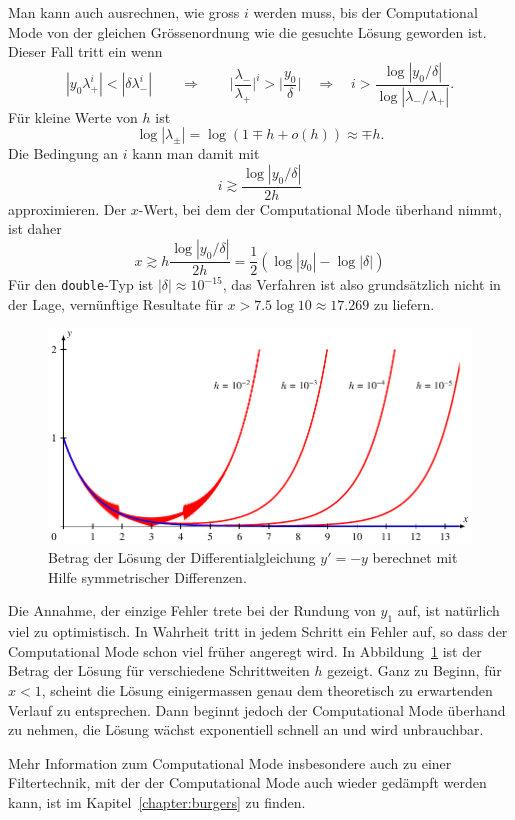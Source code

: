 Man kann auch ausrechnen, wie gross $i$ werden muss, bis der
Computational Mode von der gleichen Grössenordnung wie die
gesuchte Lösung geworden ist.
Dieser Fall tritt ein wenn
\[
|y_0\lambda_+^i| < |\delta\lambda_-^i|
\qquad\Rightarrow\qquad
\biggl|
\frac{\lambda_-}{\lambda_+}
\biggr|^i
> \biggl|\frac{y_0}{\delta}\biggr|
\quad\Rightarrow\quad
i
>
\frac{\log |y_0/\delta|}{\log|\lambda_-/\lambda_+|}.
\]
Für kleine Werte von $h$ ist
\[
\log |\lambda_\pm|
=
\log(1\mp h+o(h)) 
\approx
\mp h.
\]
Die Bedingung an $i$ kann man damit mit
\[
i \gtrsim \frac{\log |y_0/\delta|}{2h}
\]
approximieren.
Der $x$-Wert, bei dem der Computational Mode überhand nimmt, ist daher
\[
x \gtrsim h \frac{\log|y_0/\delta|}{2h} = \frac12(\log|y_0|-\log|\delta|)
\]
Für den \texttt{double}-Typ ist $|\delta| \approx 10^{-15}$,
das Verfahren ist also grundsätzlich nicht in der Lage, vernünftige
Resultate für $x>7.5\log 10\approx 17.269$ zu liefern.

\begin{figure}
\centering
\includegraphics{chapters/70-pde/experiments/computationalmode.pdf}
\caption{Betrag der Lösung der Differentialgleichung $y'=-y$ berechnet
mit Hilfe symmetrischer Differenzen.
\label{buch:pde:cm:fig}}
\end{figure}
Die Annahme, der einzige Fehler trete bei der Rundung von $y_1$ auf,
ist natürlich viel zu optimistisch.
In Wahrheit tritt in jedem Schritt ein Fehler auf, so dass der 
Computational Mode schon viel früher angeregt wird.
In Abbildung~\ref{buch:pde:cm:fig} ist der Betrag der Lösung
für verschiedene Schrittweiten $h$ gezeigt.
Ganz zu Beginn, für $x<1$, scheint die Lösung einigermassen genau dem
theoretisch zu erwartenden Verlauf zu entsprechen.
Dann beginnt jedoch der Computational Mode überhand zu nehmen,
die Lösung wächst exponentiell schnell an und wird unbrauchbar.

Mehr Information zum Computational Mode insbesondere auch zu einer
Filtertechnik, mit der der Computational Mode auch wieder gedämpft
werden kann, ist im Kapitel~\ref{chapter:burgers} zu finden.







